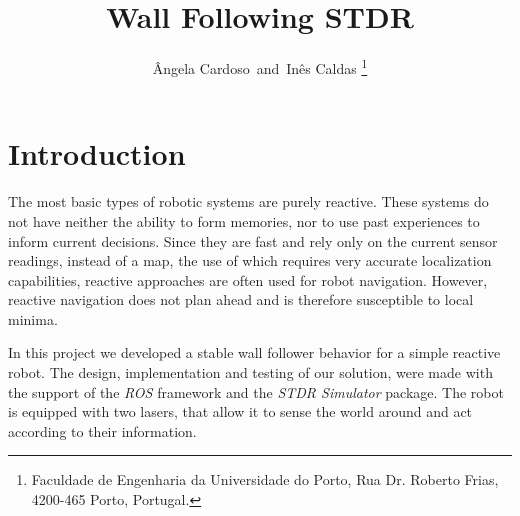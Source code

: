 \documentclass[10pt,journal,compsoc]{IEEEtran}
\begin{document}
\title{Wall Following STDR}
\author{\^{A}ngela Cardoso~and~In\^{e}s Caldas%
\thanks{Faculdade de Engenharia da Universidade do Porto, Rua Dr. Roberto Frias, 4200-465 Porto, Portugal.}}


\maketitle

\section{Introduction}
The most basic types of robotic systems are purely reactive. These systems do not have neither the ability to form memories, nor to use past experiences to inform current decisions. Since they are fast and rely only on the current sensor readings, instead of a map, the use of which requires very accurate localization capabilities, reactive approaches are often used for robot navigation. However, reactive navigation does not plan ahead and is therefore susceptible to local minima. 

In this project we developed a stable wall follower behavior for a simple reactive robot. The design, implementation and testing of our solution, were made with the support of the \textit{ROS} framework and the \textit{STDR Simulator} package. The robot is equipped with two lasers, that allow it to sense the world around and act according to their information. 
\end{document}
